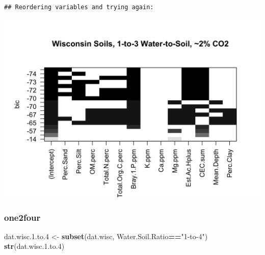 \documentclass[]{article}
\newenvironment{Shaded}{\begin{snugshade}}{\end{snugshade}}
\newcommand{\DataTypeTok}[1]{\textcolor[rgb]{0.13,0.29,0.53}{#1}}
\newcommand{\FloatTok}[1]{\textcolor[rgb]{0.00,0.00,0.81}{#1}}
\newcommand{\KeywordTok}[1]{\textcolor[rgb]{0.13,0.29,0.53}{\textbf{#1}}}
\newcommand{\NormalTok}[1]{#1}
\newcommand{\OperatorTok}[1]{\textcolor[rgb]{0.81,0.36,0.00}{\textbf{#1}}}
\newcommand{\StringTok}[1]{\textcolor[rgb]{0.31,0.60,0.02}{#1}}
\begin{document}
\begin{verbatim}
## Reordering variables and trying again:
\end{verbatim}

\begin{Shaded}
\end{Shaded}

\includegraphics{output-rmd/bic.wisc.one2three.highco2-1.png}

\hypertarget{one2four}{%
\subsubsection{one2four}\label{one2four}}

\begin{Shaded}
\begin{Highlighting}[]
\NormalTok{dat.wisc.}\FloatTok{1.}\NormalTok{to}\FloatTok{.4}\NormalTok{ <-}\StringTok{ }\KeywordTok{subset}\NormalTok{(dat.wisc, Water.Soil.Ratio}\OperatorTok{==}\StringTok{"1-to-4"}\NormalTok{)}
\KeywordTok{str}\NormalTok{(dat.wisc.}\FloatTok{1.}\NormalTok{to}\FloatTok{.4}\NormalTok{)}
\end{Highlighting}
\end{Shaded}
\end{document}
